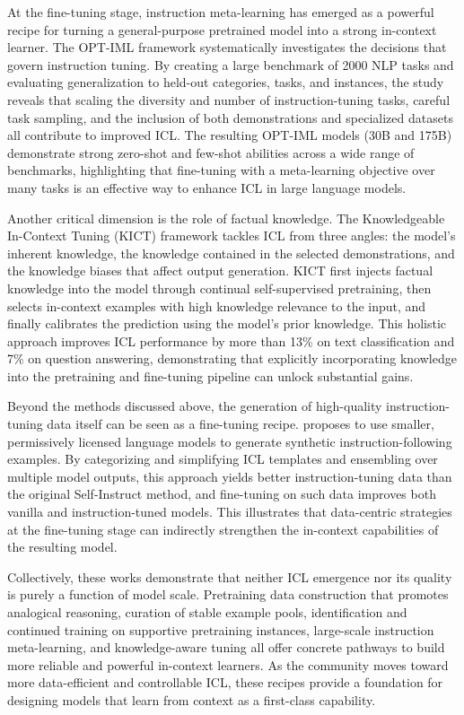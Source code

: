\documentclass[11pt]{article}
\begin{document}
At the fine-tuning stage, instruction meta-learning has emerged as a powerful recipe for turning a general-purpose pretrained model into a strong in-context learner. The OPT-IML framework \cite{ref110} systematically investigates the decisions that govern instruction tuning. By creating a large benchmark of 2000 NLP tasks and evaluating generalization to held-out categories, tasks, and instances, the study reveals that scaling the diversity and number of instruction-tuning tasks, careful task sampling, and the inclusion of both demonstrations and specialized datasets all contribute to improved ICL. The resulting OPT-IML models (30B and 175B) demonstrate strong zero-shot and few-shot abilities across a wide range of benchmarks, highlighting that fine-tuning with a meta-learning objective over many tasks is an effective way to enhance ICL in large language models.

Another critical dimension is the role of factual knowledge. The Knowledgeable In-Context Tuning (KICT) framework \cite{ref111} tackles ICL from three angles: the model's inherent knowledge, the knowledge contained in the selected demonstrations, and the knowledge biases that affect output generation. KICT first injects factual knowledge into the model through continual self-supervised pretraining, then selects in-context examples with high knowledge relevance to the input, and finally calibrates the prediction using the model's prior knowledge. This holistic approach improves ICL performance by more than 13\% on text classification and 7\% on question answering, demonstrating that explicitly incorporating knowledge into the pretraining and fine-tuning pipeline can unlock substantial gains.

Beyond the methods discussed above, the generation of high-quality instruction-tuning data itself can be seen as a fine-tuning recipe. \cite{ref102} proposes to use smaller, permissively licensed language models to generate synthetic instruction-following examples. By categorizing and simplifying ICL templates and ensembling over multiple model outputs, this approach yields better instruction-tuning data than the original Self-Instruct method, and fine-tuning on such data improves both vanilla and instruction-tuned models. This illustrates that data-centric strategies at the fine-tuning stage can indirectly strengthen the in-context capabilities of the resulting model.

Collectively, these works demonstrate that neither ICL emergence nor its quality is purely a function of model scale. Pretraining data construction that promotes analogical reasoning, curation of stable example pools, identification and continued training on supportive pretraining instances, large-scale instruction meta-learning, and knowledge-aware tuning all offer concrete pathways to build more reliable and powerful in-context learners. As the community moves toward more data-efficient and controllable ICL, these recipes provide a foundation for designing models that learn from context as a first-class capability.
\end{document}
